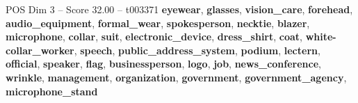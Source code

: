 \begin{textsample}{POS Dim 3 – Score 32.00 – t003371}  \label{ex:f3_pos_009}
\textbf{eyewear}, \textbf{glasses}, \textbf{vision\_care}, \textbf{forehead}, \textbf{audio\_equipment}, \textbf{formal\_wear}, \textbf{spokesperson}, \textbf{necktie}, \textbf{blazer}, \textbf{microphone}, \textbf{collar}, \textbf{suit}, \textbf{electronic\_device}, \textbf{dress\_shirt}, \textbf{coat}, \textbf{white-collar\_worker}, \textbf{speech}, \textbf{public\_address\_system}, \textbf{podium}, \textbf{lectern}, \textbf{official}, \textbf{speaker}, \textbf{flag}, \textbf{businessperson}, \textbf{logo}, \textbf{job}, \textbf{news\_conference}, \textbf{wrinkle}, \textbf{management}, \textbf{organization}, \textbf{government}, \textbf{government\_agency}, \textbf{microphone\_stand}

\end{textsample}
